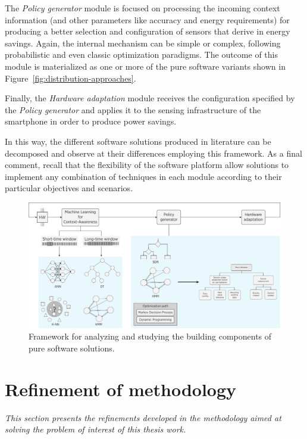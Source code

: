 \documentclass[ENG,PhD]{cinvestav}
\begin{document}
The \emph{Policy generator} module is focused on processing the incoming context information (and other parameters like accuracy and energy requirements) for producing a better selection and configuration of sensors that derive in energy savings.
Again, the internal mechanism can be simple or complex, following probabilistic and even classic optimization paradigms.
The outcome of this module is materialized as one or more of the pure software variants shown in Figure~\ref{fig:distribution-approaches}.


Finally, the \emph{Hardware adaptation} module receives the configuration specified by the \emph{Policy generator} and applies it to the sensing infrastructure of the smartphone in order to produce power savings.

In this way, the different software solutions produced in literature can be decomposed and observe at their differences employing this framework.
As a final comment, recall that the flexibility of the software platform allow solutions to implement any combination of techniques in each module according to their particular objectives and scenarios.

\begin{figure}[t]
  \centering
  \includegraphics[width=\textwidth]{dual-taxonomy-clean}
  \caption{Framework for analyzing and studying the building components of pure software solutions.}
  \label{fig:framework-pure-software-solutions}
\end{figure}










\section{Refinement of methodology}
\label{sec:methodology}
\emph{This section presents the refinements developed in the methodology aimed at solving the problem of interest of this thesis work.}
\end{document}
